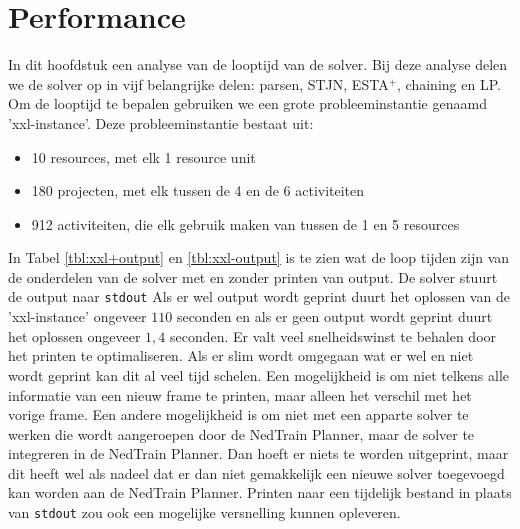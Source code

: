 \section{Performance}
In dit hoofdstuk een analyse van de looptijd van de solver. Bij deze analyse delen we de solver op in vijf belangrijke delen: parsen, STJN, ESTA$^+$, chaining en LP. Om de looptijd te bepalen gebruiken we een grote probleeminstantie genaamd 'xxl-instance'. Deze probleeminstantie bestaat uit:
\begin{itemize}
    \item 10 resources, met elk 1 resource unit
    \item 180 projecten, met elk tussen de 4 en de 6 activiteiten
    \item 912 activiteiten, die elk gebruik maken van tussen de 1 en 5 resources
\end{itemize}

In Tabel \ref{tbl:xxl+output} en \ref{tbl:xxl-output} is te zien wat de loop tijden zijn van de onderdelen van de solver met en zonder printen van output. De solver stuurt de output naar \texttt{stdout} Als er wel output wordt geprint duurt het oplossen van de 'xxl-instance' ongeveer $110$ seconden en als er geen output wordt geprint duurt het oplossen ongeveer $1,4$ seconden. Er valt veel snelheidswinst te behalen door het printen te optimaliseren. Als er slim wordt omgegaan wat er wel en niet wordt geprint kan dit al veel tijd schelen. Een mogelijkheid is om niet telkens alle informatie van een nieuw frame te printen, maar alleen het verschil met het vorige frame. Een andere mogelijkheid is om niet met een apparte solver te werken die wordt aangeroepen door de NedTrain Planner, maar de solver te integreren in de NedTrain Planner. Dan hoeft er niets te worden uitgeprint, maar dit heeft wel als nadeel dat er dan niet gemakkelijk een nieuwe solver toegevoegd kan worden aan de NedTrain Planner. Printen naar een tijdelijk bestand in plaats van \texttt{stdout} zou ook een mogelijke versnelling kunnen opleveren. 

